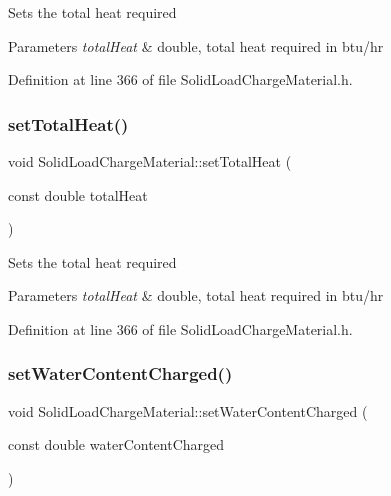 Sets the total heat required 
\begin{DoxyParams}{Parameters}
{\em total\+Heat} & double, total heat required in btu/hr \\
\hline
\end{DoxyParams}


Definition at line 366 of file Solid\+Load\+Charge\+Material.\+h.

\mbox{\label{class_solid_load_charge_material_a624a92d35d338e4b5f130c782d48e4f7}} 
\subsubsection{\texorpdfstring{set\+Total\+Heat()}{setTotalHeat()}\hspace{0.1cm}{\footnotesize\ttfamily [3/3]}}
{\footnotesize\ttfamily void Solid\+Load\+Charge\+Material\+::set\+Total\+Heat (\begin{DoxyParamCaption}\item[{const double}]{total\+Heat }\end{DoxyParamCaption})\hspace{0.3cm}{\ttfamily [inline]}}

Sets the total heat required 
\begin{DoxyParams}{Parameters}
{\em total\+Heat} & double, total heat required in btu/hr \\
\hline
\end{DoxyParams}


Definition at line 366 of file Solid\+Load\+Charge\+Material.\+h.

\mbox{\label{class_solid_load_charge_material_abf43422318a1b9120dff1dcfb15d5265}} 
\subsubsection{\texorpdfstring{set\+Water\+Content\+Charged()}{setWaterContentCharged()}\hspace{0.1cm}{\footnotesize\ttfamily [1/3]}}
{\footnotesize\ttfamily void Solid\+Load\+Charge\+Material\+::set\+Water\+Content\+Charged (\begin{DoxyParamCaption}\item[{const double}]{water\+Content\+Charged }\end{DoxyParamCaption})\hspace{0.3cm}{\ttfamily [inline]}}

